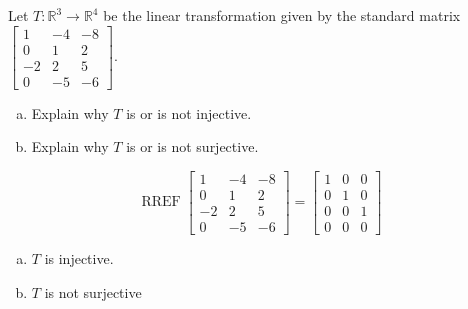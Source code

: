
\begin{exerciseStatement}
 Let \(T:\mathbb{R}^ 3  \to \mathbb{R}^ 4 \) be the linear transformation given by the standard matrix \( \left[\begin{array}{ccc}
1 & -4 & -8 \\
0 & 1 & 2 \\
-2 & 2 & 5 \\
0 & -5 & -6
\end{array}\right] .\)
\begin{enumerate}[(a)]
\item Explain why \(T\) is or is not injective.
\item Explain why \(T\) is or is not surjective.
\end{enumerate}
    
\end{exerciseStatement}
    
\begin{exerciseAnswer} 


\[\operatorname{RREF} \left[\begin{array}{ccc}
1 & -4 & -8 \\
0 & 1 & 2 \\
-2 & 2 & 5 \\
0 & -5 & -6
\end{array}\right] = \left[\begin{array}{ccc}
1 & 0 & 0 \\
0 & 1 & 0 \\
0 & 0 & 1 \\
0 & 0 & 0
\end{array}\right] \]


\begin{enumerate}[(a)]
\item \(T\) is injective.
\item \(T\) is not surjective
\end{enumerate}
    
\end{exerciseAnswer}
    
